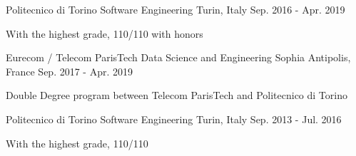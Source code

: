

\begin{cventries}

  \cventry
    {Politecnico di Torino}
    { Software Engineering}
    {Turin, Italy}
    {Sep. 2016 - Apr. 2019}
    {
        \begin{cvitems}
            \item {With the highest grade, \textsc{110/110} with honors}
        \end{cvitems}
    }

  \cventry
    {Eurecom / Telecom ParisTech} %
    { Data Science and Engineering} %
    {Sophia Antipolis, France} %
    {Sep. 2017 - Apr. 2019} %
    {
      \begin{cvitems} %
        \item {Double Degree program between Telecom ParisTech and Politecnico di Torino}
      \end{cvitems}
    }
  
  \cventry
    {Politecnico di Torino}
    { Software Engineering}
    {Turin, Italy}
    {Sep. 2013 - Jul. 2016}
    {
      \begin{cvitems}
        \item {With the highest grade, \textsc{110/110}}
      \end{cvitems}
    }

\end{cventries}
